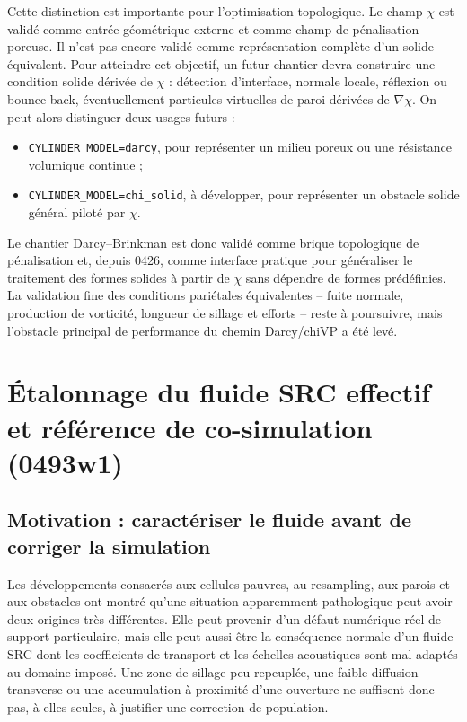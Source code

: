 \documentclass[11pt,a4paper]{article}
\begin{document}
Cette distinction est importante pour l'optimisation topologique. Le champ $\chi$ est validé comme entrée géométrique externe et comme champ de pénalisation poreuse. Il n'est pas encore validé comme représentation complète d'un solide équivalent. Pour atteindre cet objectif, un futur chantier devra construire une condition solide dérivée de $\chi$ : détection d'interface, normale locale, réflexion ou bounce-back, éventuellement particules virtuelles de paroi dérivées de $\nabla\chi$. On peut alors distinguer deux usages futurs :
\begin{itemize}[leftmargin=*]
  \item \texttt{CYLINDER\_MODEL=darcy}, pour représenter un milieu poreux ou une résistance volumique continue ;
  \item \texttt{CYLINDER\_MODEL=chi\_solid}, à développer, pour représenter un obstacle solide général piloté par $\chi$.
\end{itemize}

Le chantier Darcy--Brinkman est donc validé comme brique topologique de pénalisation et, depuis 0426, comme interface pratique pour généraliser le traitement des formes solides à partir de $\chi$ sans dépendre de formes prédéfinies. La validation fine des conditions pariétales équivalentes -- fuite normale, production de vorticité, longueur de sillage et efforts -- reste à poursuivre, mais l'obstacle principal de performance du chemin Darcy/chiVP a été levé.

\section{Étalonnage du fluide SRC effectif et référence de co-simulation (0493w1)}
\label{sec:etalonnage-src-effectif}

\subsection{Motivation : caractériser le fluide avant de corriger la simulation}

Les développements consacrés aux cellules pauvres, au resampling, aux parois et aux obstacles ont montré qu'une situation apparemment pathologique peut avoir deux origines très différentes. Elle peut provenir d'un défaut numérique réel de support particulaire, mais elle peut aussi être la conséquence normale d'un fluide SRC dont les coefficients de transport et les échelles acoustiques sont mal adaptés au domaine imposé. Une zone de sillage peu repeuplée, une faible diffusion transverse ou une accumulation à proximité d'une ouverture ne suffisent donc pas, à elles seules, à justifier une correction de population.
\end{document}
